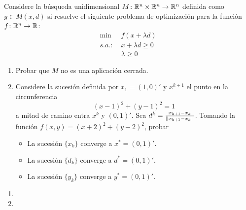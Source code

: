 \documentclass[twoside]{article}
\begin{document}
\begin{ejercicio}{5}
Considere la búsqueda unidimensional $M\colon\mathbb{R}^n\times\mathbb{R}^n\to\mathbb{R}^n$ definida como $y\in M(x,d)$ si resuelve el siguiente problema de optimización para la función $f\colon \mathbb{R}^n\to\mathbb{R}$:
\begin{align}
\min&\;f(x+\lambda d)\\
s.a.:&\;x+\lambda d\geq 0\\
&\;\lambda \geq  0
\end{align}
\begin{enumerate}
\item Probar que $M$ no es una aplicación cerrada.
\item Considere la sucesión definida por $x_1=(1,0)'$ y $x^{k+1}$ el punto en la circunferencia 
$$
(x-1)^2 + (y-1)^2 = 1
$$
a mitad de camino entra $x^k$ y $(0,1)'$. Sea $d^k=\frac{x_{k+1}-x_k}{\left\lVert x_{k+1}-x_k\right\rVert}$. Tomando la función $f(x,y)= (x+2)^2+(y-2)^2$, probar
\begin{itemize}
\item La sucesión $\{x_k\}$ converge a $x^*=(0,1)'$.
\item La sucesión $\{d_k\}$ converge a $d^*=(0,1)'$.
\item La sucesión $\{y_k\}$ converge a $y^*=(0,1)'$.
\end{itemize}
\end{enumerate}
\end{ejercicio}
\begin{solucion}
\begin{enumerate}
\item[]
\item 
\end{enumerate}
\end{solucion}
\newpage
\end{document}
